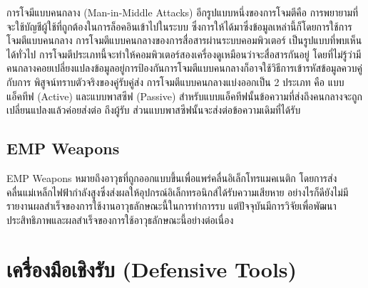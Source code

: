 \documentclass[../th_cyber_warfare_distilled.tex]{subfiles}
\begin{document}
การโจมีแบบคนกลาง (Man-in-Middle Attacks)
อีกรูปแบบหนึ่งของการโจมตีคือ การพยายามที่จะใช้บัญชีผู้ใช้ที่ถูกต้องในการล็อคอินเข้าไปในระบบ ซึ่งการให้ได้มาซึ่งข้อมูลเหล่านี้ก็โดยการใช้การโจมตีแบบคนกลาง การโจมตีแบบคนกลางของการสื่อสารผ่านระบบคอมพิวเตอร์ เป็นรูปแบบที่พบเห็นได้ทั่วไป การโจมตีประเภทนี้จะทำให้คอมพิวเตอร์สองเครื่องดูเหมือนว่าจะสื่อสารกันอยู่ โดยที่ไม่รู้ว่ามีคนกลางคอยเปลี่ยงแปลงข้อมูลอยู่การป้องกันการโจมตีแบบคนกลางก็อาจใช้วิธีการเข้ารหัสข้อมูลควบคู่กับการ พิสูจน์ทราบตัวจริงของคู่รับคู่ส่ง การโจมตีแบบคนกลางแบ่งออกเป็น 2 ประเภท คือ แบบแอ็คทีฟ (Active) และแบบพาสซีฟ (Passive) สำหรับแบบแอ็คทีฟนั้นข้อความที่ส่งถึงคนกลางจะถูกเปลี่ยนแปลงแล้วค่อยส่งต่อ ถึงผู้รับ ส่วนแบบพาสซีฟนั้นจะส่งต่อข้อความเดิมที่ได้รับ


\subsection{EMP Weapons}
EMP Weapons หมายถึงอาวุธที่ถูกออกแบบขึ้นเพื่อแพร่คลื่นอิเล็กโทรแมคเนติก โดยการส่งคลื่นแม่เหล็กไฟฟ้ากำลังสูงซึ่งส่งผลให้อุปกรณ์อิเล็กทรอนิกส์ได้รับความเสียหาย อย่างไรก็ดียังไม่มีรายงานผลสำเร็จของการใช้งานอาวุธลักษณะนี้ในการทำการรบ แต่ปัจจุบันมีการวิจัยเพื่อพัฒนาประสิทธิภาพและผลสำเร็จของการใช้อาวุธลักษณะนี้อย่างต่อเนื่อง

\section{เครื่องมือเชิงรับ (Defensive Tools)}
\end{document}

